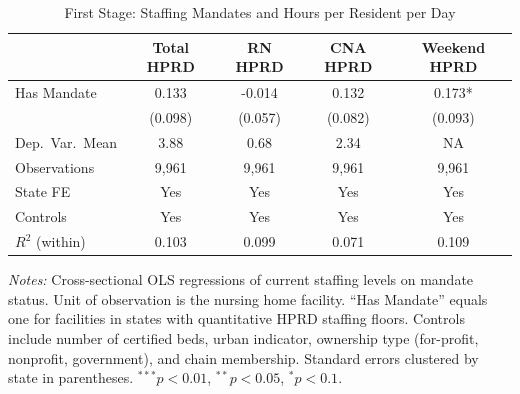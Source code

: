 \begin{table}[htbp]
\centering
\caption{First Stage: Staffing Mandates and Hours per Resident per Day}
\label{tab:first_stage}
\begin{tabular}{lcccc}
\hline\hline
 & Total HPRD & RN HPRD & CNA HPRD & Weekend HPRD \\
\hline
Has Mandate & 0.133 & -0.014 & 0.132 & 0.173* \\
 & (0.098) & (0.057) & (0.082) & (0.093) \\
\hline
Dep.\ Var.\ Mean & 3.88 & 0.68 & 2.34 & NA \\
Observations & 9,961 & 9,961 & 9,961 & 9,961 \\
State FE & Yes & Yes & Yes & Yes \\
Controls & Yes & Yes & Yes & Yes \\
$R^2$ (within) & 0.103 & 0.099 & 0.071 & 0.109 \\
\hline\hline
\end{tabular}
\begin{tablenotes}[flushleft]
\small
\item \textit{Notes:} Cross-sectional OLS regressions of current staffing levels on mandate status. Unit of observation is the nursing home facility. ``Has Mandate'' equals one for facilities in states with quantitative HPRD staffing floors. Controls include number of certified beds, urban indicator, ownership type (for-profit, nonprofit, government), and chain membership. Standard errors clustered by state in parentheses. $^{***}p<0.01$, $^{**}p<0.05$, $^{*}p<0.1$.
\end{tablenotes}
\end{table}
